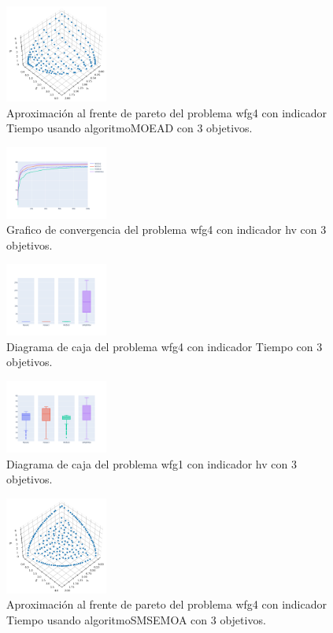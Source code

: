 \documentclass{article}
\begin{document}
\begin{figure}
	\includegraphics[width=0.3\textwidth]{MOEAD_wfg4_Tiempo_3_fp.png}
	\caption{Aproximación al frente de pareto del problema wfg4 con indicador Tiempo usando algoritmoMOEAD con 3 objetivos.}
\end{figure}
\clearpage
\begin{figure}
	\includegraphics[width=0.3\textwidth]{wfg4_hv_3_gc.png}
	\caption{Grafico de convergencia del problema wfg4 con indicador hv con 3 objetivos.}
\end{figure}
\begin{figure}
	\includegraphics[width=0.3\textwidth]{wfg4_Tiempo_3_bp.png}
	\caption{Diagrama de caja del problema wfg4 con indicador Tiempo con 3 objetivos.}
\end{figure}
\begin{figure}
	\includegraphics[width=0.3\textwidth]{wfg1_hv_3_bp.png}
	\caption{Diagrama de caja del problema wfg1 con indicador hv con 3 objetivos.}
\end{figure}
\clearpage
\begin{figure}
	\includegraphics[width=0.3\textwidth]{SMSEMOA_wfg4_Tiempo_3_fp.png}
	\caption{Aproximación al frente de pareto del problema wfg4 con indicador Tiempo usando algoritmoSMSEMOA con 3 objetivos.}
\end{figure}
\end{document}
